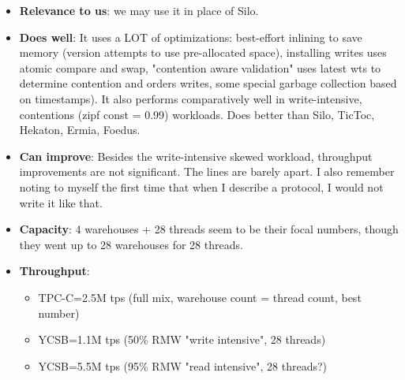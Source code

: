 \begin{itemize}
    \item \textbf{Relevance to us}: we may use it in place of Silo. 
    \item \textbf{Does well}: It uses a LOT of optimizations: best-effort inlining to save memory (version attempts to use pre-allocated space), installing writes uses atomic compare and swap, "contention aware validation" uses latest wts to determine contention and orders writes, some special garbage collection based on timestamps). It also performs comparatively well in write-intensive, contentions (zipf const = 0.99) workloads. Does better than Silo, TicToc, Hekaton, Ermia, Foedus.
    \item\textbf{Can improve}: Besides the write-intensive skewed workload, throughput improvements are not significant. The lines are barely apart. I also remember noting to myself the first time that when I describe a protocol, I would not write it like that.  
    \item\textbf{Capacity}: 4 warehouses + 28 threads seem to be their focal numbers, though they went up to 28 warehouses for 28 threads.
    \item \textbf{Throughput}:\begin{itemize}
        \item TPC-C=2.5M tps (full mix, warehouse count = thread count, best number)
        \item YCSB=1.1M tps (50\% RMW "write intensive", 28 threads)
        \item YCSB=5.5M tps (95\% RMW "read intensive", 28 threads?)
    \end{itemize}
\end{itemize}
